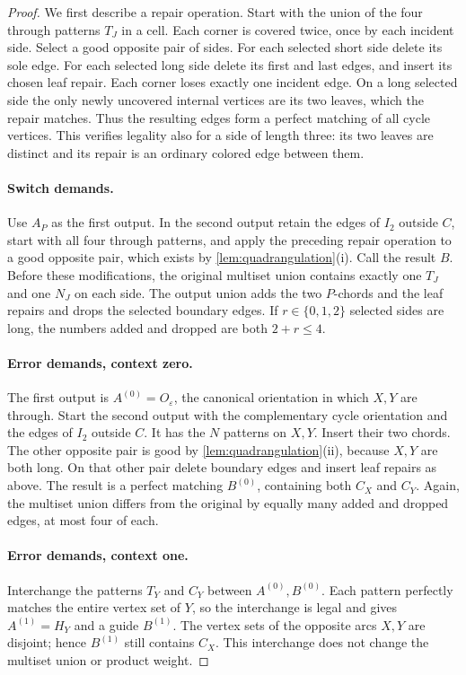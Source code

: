 \documentclass[11pt]{article}
\theoremstyle{definition}
\theoremstyle{remark}
\numberwithin{equation}{section}
\begin{document}
\begin{proof}
We first describe a repair operation.  Start with the union of the
four through patterns $T_J$ in a cell.  Each corner is covered twice,
once by each incident side.  Select a good opposite pair of sides.
For each selected short side delete its sole edge.  For each selected
long side delete its first and last edges, and insert its chosen leaf
repair.  Each corner loses exactly one incident edge.  On a long
selected side the only newly uncovered internal vertices are its
two leaves, which the repair matches.  Thus the resulting edges form
a perfect matching of all cycle vertices.  This verifies legality
also for a side of length three: its two leaves are distinct and
its repair is an ordinary colored edge between them.

\paragraph{Switch demands.}
Use $A_P$ as the first output.  In the second output retain the edges
of $I_2$ outside $C$, start with all four through patterns, and apply
the preceding repair operation to a good opposite pair, which exists
by \cref{lem:quadrangulation}(i).  Call the result $B$.
Before these modifications, the original multiset union contains
exactly one $T_J$ and one $N_J$ on each side.  The output union adds
the two $P$-chords and the leaf repairs and drops the selected boundary
edges.  If $r\in\{0,1,2\}$ selected sides are long, the numbers added
and dropped are both $2+r\le4$.

\paragraph{Error demands, context zero.}
The first output is $A^{(0)}=O_\varepsilon$, the canonical orientation
in which $X,Y$ are through.  Start the second output with the
complementary cycle orientation and the edges of $I_2$ outside $C$.
It has the $N$ patterns on $X,Y$.  Insert their two chords.  The
other opposite pair is good by \cref{lem:quadrangulation}(ii),
because $X,Y$ are both long.  On that other pair delete boundary
edges and insert leaf repairs as above.  The result is a perfect
matching $B^{(0)}$, containing both $C_X$ and $C_Y$.  Again, the
multiset union differs from the original by equally many added
and dropped edges, at most four of each.

\paragraph{Error demands, context one.}
Interchange the patterns $T_Y$ and $C_Y$ between
$A^{(0)},B^{(0)}$.  Each pattern perfectly matches the entire vertex
set of $Y$, so the interchange is legal and gives
$A^{(1)}=H_Y$ and a guide $B^{(1)}$.  The vertex sets of the opposite
arcs $X,Y$ are disjoint; hence $B^{(1)}$ still contains $C_X$.
This interchange does not change the multiset union or product weight.


\end{proof}
\end{document}
